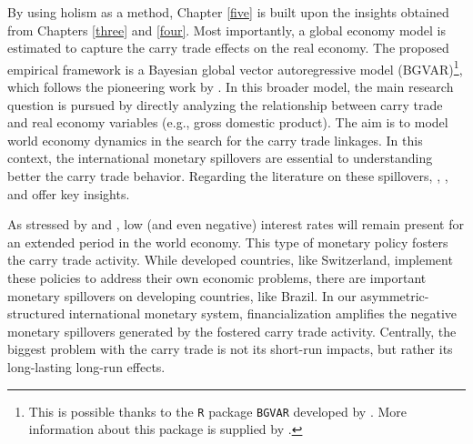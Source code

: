 \documentclass[a4paper, twoside]{templates/ociamthesis}
\begin{document}
By using holism as a method, Chapter \ref{five} is built upon the insights obtained from Chapters \ref{three} and \ref{four}. Most importantly, a global economy model is estimated to capture the carry trade effects on the real economy. The proposed empirical framework is a Bayesian global vector autoregressive model (BGVAR)\footnote{This is possible thanks to the \texttt{R} package \texttt{BGVAR} developed by \textcite{bock2021}. More information about this package is supplied by \textcite{bock2020}.}, which follows the pioneering work by \textcite{pesaran2004}. In this broader model, the main research question is pursued by directly analyzing the relationship between carry trade and real economy variables (e.g., gross domestic product). The aim is to model world economy dynamics in the search for the carry trade linkages. In this context, the international monetary spillovers are essential to understanding better the carry trade behavior. Regarding the literature on these spillovers, \textcite{miranda-agrippino2021}, \textcite{cavaca2021}, \textcite{bernoth2021} and \textcite{breitenlechner2021} offer key insights.

As stressed by \textcite{hauzenberger2021} and \textcite{jorda2021}, low (and even negative) interest rates will remain present for an extended period in the world economy. This type of monetary policy fosters the carry trade activity. While developed countries, like Switzerland, implement these policies to address their own economic problems, there are important monetary spillovers on developing countries, like Brazil. In our asymmetric-structured international monetary system, financialization amplifies the negative monetary spillovers generated by the fostered carry trade activity. Centrally, the biggest problem with the carry trade is not its short-run impacts, but rather its long-lasting long-run effects.
\end{document}
